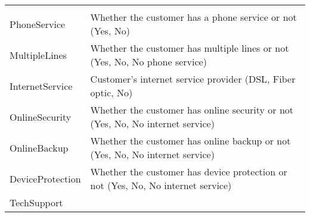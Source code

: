 \begin{longtable}[]{@{}ll@{}}
\begin{minipage}[t]{0.43\columnwidth}
\end{minipage}\tabularnewline
\begin{minipage}[t]{0.52\columnwidth}\raggedright
PhoneService\strut
\end{minipage} & \begin{minipage}[t]{0.43\columnwidth}\raggedright
Whether the customer has a phone service or not (Yes, No)\strut
\end{minipage}\tabularnewline
\begin{minipage}[t]{0.52\columnwidth}\raggedright
MultipleLines\strut
\end{minipage} & \begin{minipage}[t]{0.43\columnwidth}\raggedright
Whether the customer has multiple lines or not (Yes, No, No phone
service)\strut
\end{minipage}\tabularnewline
\begin{minipage}[t]{0.52\columnwidth}\raggedright
InternetService\strut
\end{minipage} & \begin{minipage}[t]{0.43\columnwidth}\raggedright
Customer's internet service provider (DSL, Fiber optic, No)\strut
\end{minipage}\tabularnewline
\begin{minipage}[t]{0.52\columnwidth}\raggedright
OnlineSecurity\strut
\end{minipage} & \begin{minipage}[t]{0.43\columnwidth}\raggedright
Whether the customer has online security or not (Yes, No, No internet
service)\strut
\end{minipage}\tabularnewline
\begin{minipage}[t]{0.52\columnwidth}\raggedright
OnlineBackup\strut
\end{minipage} & \begin{minipage}[t]{0.43\columnwidth}\raggedright
Whether the customer has online backup or not (Yes, No, No internet
service)\strut
\end{minipage}\tabularnewline
\begin{minipage}[t]{0.52\columnwidth}\raggedright
DeviceProtection\strut
\end{minipage} & \begin{minipage}[t]{0.43\columnwidth}\raggedright
Whether the customer has device protection or not (Yes, No, No internet
service)\strut
\end{minipage}\tabularnewline
\begin{minipage}[t]{0.52\columnwidth}\raggedright
TechSupport\strut

\end{minipage}
\end{longtable}
